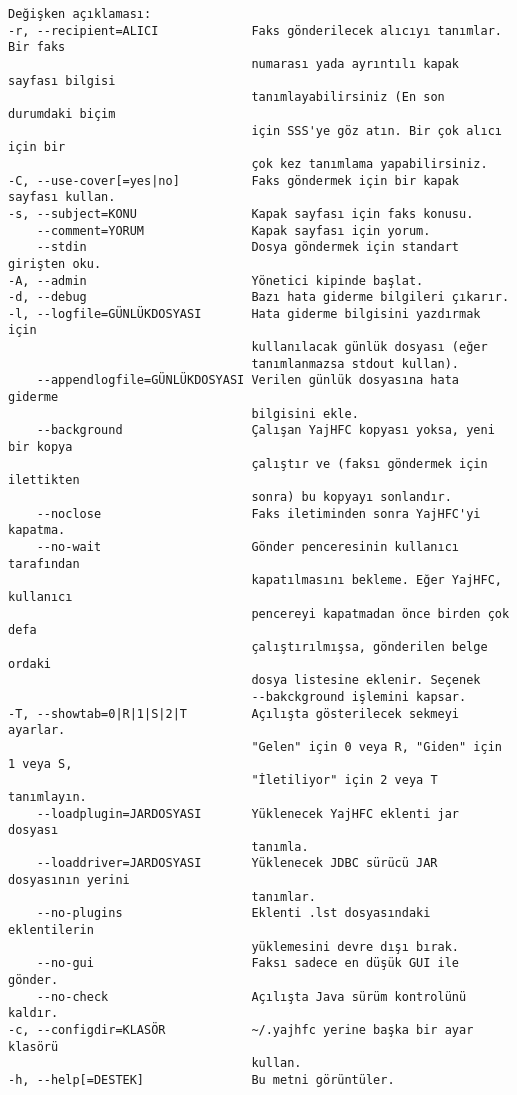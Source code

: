\documentclass[a4paper,10pt]{scrartcl}
\begin{document}
\begin{verbatim}
Değişken açıklaması:
-r, --recipient=ALICI             Faks gönderilecek alıcıyı tanımlar. Bir faks
                                  numarası yada ayrıntılı kapak sayfası bilgisi
                                  tanımlayabilirsiniz (En son durumdaki biçim
                                  için SSS'ye göz atın. Bir çok alıcı için bir
                                  çok kez tanımlama yapabilirsiniz.
-C, --use-cover[=yes|no]          Faks göndermek için bir kapak sayfası kullan.
-s, --subject=KONU                Kapak sayfası için faks konusu.
    --comment=YORUM               Kapak sayfası için yorum.
    --stdin                       Dosya göndermek için standart girişten oku.
-A, --admin                       Yönetici kipinde başlat.
-d, --debug                       Bazı hata giderme bilgileri çıkarır.
-l, --logfile=GÜNLÜKDOSYASI       Hata giderme bilgisini yazdırmak için
                                  kullanılacak günlük dosyası (eğer
                                  tanımlanmazsa stdout kullan).
    --appendlogfile=GÜNLÜKDOSYASI Verilen günlük dosyasına hata giderme
                                  bilgisini ekle.
    --background                  Çalışan YajHFC kopyası yoksa, yeni bir kopya
                                  çalıştır ve (faksı göndermek için ilettikten
                                  sonra) bu kopyayı sonlandır.
    --noclose                     Faks iletiminden sonra YajHFC'yi kapatma.
    --no-wait                     Gönder penceresinin kullanıcı tarafından
                                  kapatılmasını bekleme. Eğer YajHFC, kullanıcı
                                  pencereyi kapatmadan önce birden çok defa
                                  çalıştırılmışsa, gönderilen belge ordaki
                                  dosya listesine eklenir. Seçenek
                                  --bakckground işlemini kapsar.
-T, --showtab=0|R|1|S|2|T         Açılışta gösterilecek sekmeyi ayarlar.
                                  "Gelen" için 0 veya R, "Giden" için 1 veya S,
                                  "İletiliyor" için 2 veya T tanımlayın.
    --loadplugin=JARDOSYASI       Yüklenecek YajHFC eklenti jar dosyası
                                  tanımla.
    --loaddriver=JARDOSYASI       Yüklenecek JDBC sürücü JAR dosyasının yerini
                                  tanımlar.
    --no-plugins                  Eklenti .lst dosyasındaki eklentilerin
                                  yüklemesini devre dışı bırak.
    --no-gui                      Faksı sadece en düşük GUI ile gönder.
    --no-check                    Açılışta Java sürüm kontrolünü kaldır.
-c, --configdir=KLASÖR            ~/.yajhfc yerine başka bir ayar klasörü
                                  kullan.
-h, --help[=DESTEK]               Bu metni görüntüler.
\end{verbatim}
\end{document}
